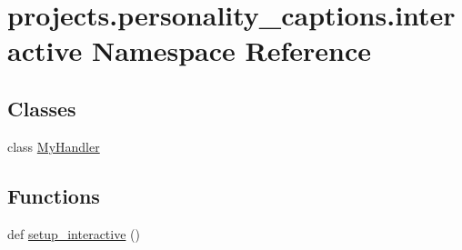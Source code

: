 \hypertarget{namespaceprojects_1_1personality__captions_1_1interactive}{}\section{projects.\+personality\+\_\+captions.\+interactive Namespace Reference}
\label{namespaceprojects_1_1personality__captions_1_1interactive}
\subsection*{Classes}
\begin{DoxyCompactItemize}
\item 
class \hyperlink{classprojects_1_1personality__captions_1_1interactive_1_1MyHandler}{My\+Handler}
\end{DoxyCompactItemize}
\subsection*{Functions}
\begin{DoxyCompactItemize}
\item 
def \hyperlink{namespaceprojects_1_1personality__captions_1_1interactive_aa5144adf4092cfa1c2dc076d766226a1}{setup\+\_\+interactive} ()
\end{DoxyCompactItemize}
